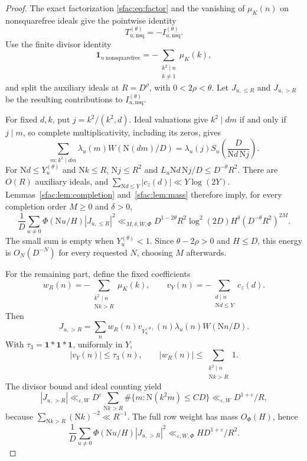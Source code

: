 \documentclass[11pt]{article}
\numberwithin{equation}{section}
\theoremstyle{definition}
\theoremstyle{remark}
\newcommand{\N}{\mathrm N}
\newcommand{\muK}{\mu_K}
\newcommand{\ind}{\mathbf 1}
\newcommand{\eps}{\varepsilon}
\begin{document}
\begin{proof}
The exact factorization \eqref{sfac:eq:factor} and the vanishing of
\(\muK(n)\) on nonsquarefree ideals give the pointwise identity
\begin{equation}\label{eq:nsq-small-tail}
 T_{u,\mathrm{nsq}}^{(\theta)}
       =-I_{u,\mathrm{nsq}}^{(\theta)}.
\end{equation}
Use the finite divisor identity
\[
 \ind_{n\ \mathrm{nonsquarefree}}
       =-\sum_{\substack{k^2\mid n\\k\ne1}}\muK(k),
\]
and split the auxiliary ideals at \(R=D^\rho\), with
\(0<2\rho<\theta\). Let \(J_{u,\le R}\) and \(J_{u,>R}\) be the
resulting contributions to \(I_{u,\mathrm{nsq}}^{(\theta)}\).

For fixed \(d,k\), put \(j=k^2/(k^2,d)\). Ideal valuations give
\(k^2\mid dm\) if and only if \(j\mid m\), so complete multiplicativity,
including its zeros, gives
\[
 \sum_{m:k^2\mid dm}\lambda_u(m)W(\N(dm)/D)
 =\lambda_u(j)S_u\!\left(\frac D{\N d\,\N j}\right).
\]
For \(\N d\le Y_u^{(\theta)}\) and \(\N k\le R\),
\(\N j\le R^2\) and \(L_u\N d\,\N j/D\le D^{-\theta}R^2\).
There are \(O(R)\) auxiliary ideals, and
\(\sum_{\N d\le Y}|c_z(d)|\ll Y\log(2Y)\).
Lemmas~\ref{sfac:lem:completion} and~\ref{sfac:lem:mass} therefore imply,
for every completion order \(M\ge0\) and \(\delta>0\),
\begin{equation}\label{eq:nsq-small-square}
 \frac1D\sum_{u\ne0}\Phi(\N u/H)|J_{u,\le R}|^2
 \ll_{M,\delta,W,\Phi}
 D^{1-2\theta}R^2\log^2(2D)H^\delta
                         (D^{-\theta}R^2)^{2M}.
\end{equation}
The small sum is empty when \(Y_u^{(\theta)}<1\).
Since \(\theta-2\rho>0\) and \(H\le D\), this energy is
\(O_N(D^{-N})\) for every requested \(N\), choosing \(M\) afterwards.

For the remaining part, define the fixed coefficients
\[
 w_R(n)=-\sum_{\substack{k^2\mid n\\\N k>R}}\muK(k),
 \qquad
 v_Y(n)=-\sum_{\substack{d\mid n\\\N d\le Y}}c_z(d).
\]
Then
\[
 J_{u,>R}=\sum_n w_R(n)v_{Y_u^{(\theta)}}(n)
                         \lambda_u(n)W(\N n/D).
\]
With \(\tau_3=\mathbf1*\mathbf1*\mathbf1\), uniformly in \(Y\),
\[
 |v_Y(n)|\le\tau_3(n),\qquad
 |w_R(n)|\le\sum_{\substack{k^2\mid n\\\N k>R}}1.
\]
The divisor bound and ideal counting yield
\[
 |J_{u,>R}|
 \ll_{\eps,W}D^\eps
       \sum_{\N k>R}\#\{m:\N(k^2m)\le CD\}
 \ll_{\eps,W}D^{1+\eps}/R,
\]
because \(\sum_{\N k>R}(\N k)^{-2}\ll R^{-1}\).
The full row weight has mass \(O_\Phi(H)\), hence
\begin{equation}\label{eq:nsq-elementary-large}
 \frac1D\sum_{u\ne0}\Phi(\N u/H)|J_{u,>R}|^2
                  \ll_{\eps,W,\Phi}HD^{1+\eps}/R^2.
\end{equation}


\end{proof}
\end{document}
